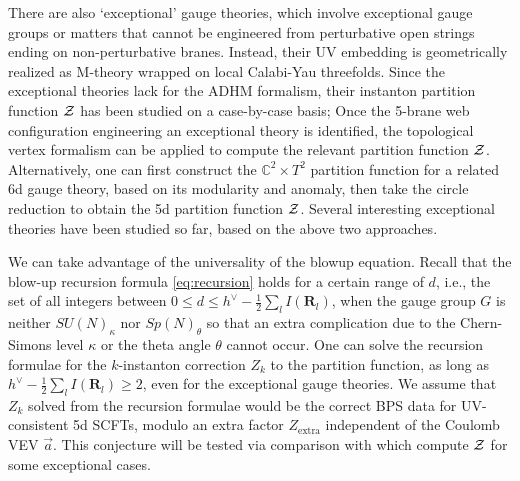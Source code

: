 \documentclass[letterpaper, 11pt]{article}
\def\IC{\mathbb{C}}
\def\CZ{{\cal Z}}
\def\k{\kappa}
\begin{document}
{There are also `exceptional' gauge theories, which involve exceptional gauge groups or matters that cannot be engineered from perturbative open strings ending on non-perturbative branes. Instead, their UV embedding is geometrically realized as M-theory wrapped on local Calabi-Yau threefolds. Since the exceptional theories lack for the ADHM formalism, their instanton partition function $\CZ$ has been studied on a case-by-case basis; Once the 5-brane web configuration engineering an exceptional theory is identified, the topological vertex formalism can be applied to compute the relevant partition function $\CZ$. Alternatively, one can first construct the $\IC^2 \times T^2$ partition function for a related 6d gauge theory, based on its modularity and anomaly, then take the circle reduction to obtain the 5d partition function $\CZ$. Several interesting exceptional theories have been studied so far, based on the above two approaches.

We can take advantage of the universality of the blowup equation. Recall that the blow-up recursion formula \eqref{eq:recursion} holds for a certain range of $d$, i.e., the set of all integers between $0 \leq d \leq h^\vee - \frac{1}{2}\sum_l I(\mathbf{R}_l)$, when the gauge group $G$ is neither $ SU(N)_\k$ nor $Sp(N)_\theta$ so that an extra complication due to the Chern-Simons level $\kappa$ or  the theta angle $\theta$ cannot occur. 
One can solve the recursion formulae for the $k$-instanton correction $Z_k$ to the partition function, as long as $h^\vee - \frac{1}{2}\sum_l I(\mathbf{R}_l) \geq 2$, even for the exceptional gauge theories. We assume that  $Z_k$ solved from the recursion formulae would be the correct BPS data for UV-consistent 5d SCFTs, modulo an extra factor $Z_\text{extra}$ independent of the Coulomb VEV $\vec{a}$. This conjecture will be tested via comparison with \cite{Kim:2018gjo, 
DelZotto:2018tcj,Hayashi:2019yxj} which compute $\CZ$ for some exceptional cases. 


}
\end{document}
